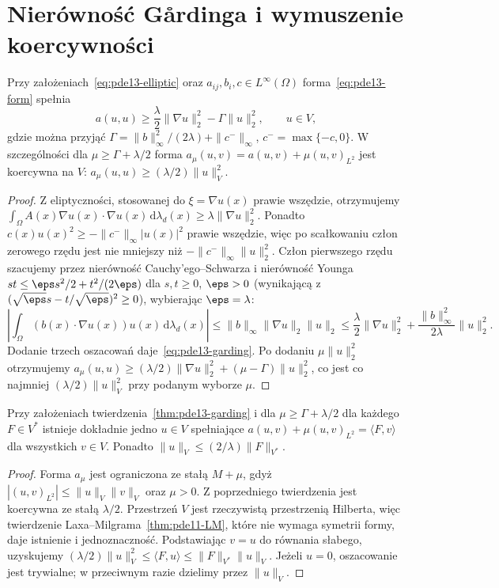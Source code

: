 \section{Nierówność Gårdinga i wymuszenie koercywności}
\label{sec:pde13-garding}
\begin{twierdzenie}
\label{thm:pde13-garding}
Przy założeniach~\eqref{eq:pde13-elliptic} oraz
$a_{ij},b_i,c\in L^\infty(\Omega)$ forma~\eqref{eq:pde13-form}
spełnia
\begin{equation}\label{eq:pde13-garding}
 a(u,u)\geq\frac\lambda2\|\nabla u\|_2^2
 -\Gamma\|u\|_2^2,\qquad u\in V,
\end{equation}
gdzie można przyjąć
$\Gamma=\|b\|_\infty^2/(2\lambda)+\|c^-\|_\infty$,
$c^-=\max\{-c,0\}$. W szczególności dla
$\mu\geq\Gamma+\lambda/2$ forma
$a_\mu(u,v)=a(u,v)+\mu(u,v)_{L^2}$ jest koercywna na $V$:
$a_\mu(u,u)\geq(\lambda/2)\|u\|_V^2$.
\end{twierdzenie}
\begin{proof}
Z eliptyczności, stosowanej do $\xi=\nabla u(x)$ prawie wszędzie,
otrzymujemy
$\int_\Omega A(x)\nabla u(x)\cdot\nabla u(x)\,\mathrm d\lambda_d(x)
\geq\lambda\|\nabla u\|_2^2$.
Ponadto $c(x)u(x)^2\geq-\|c^-\|_\infty |u(x)|^2$ prawie wszędzie,
więc po scałkowaniu człon zerowego rzędu jest nie mniejszy
niż $-\|c^-\|_\infty\|u\|_2^2$.
Człon pierwszego rzędu szacujemy przez nierówność Cauchy'ego--Schwarza
i nierówność Younga $st\leq\eps s^2/2+t^2/(2\eps)$
dla $s,t\geq0$, $\eps>0$ (wynikającą z
$(\sqrt{\eps}s-t/\sqrt{\eps})^2\geq0$), wybierając $\eps=\lambda$:
\[
 \left|\int_\Omega(b(x)\cdot\nabla u(x))u(x)\,\mathrm d\lambda_d(x)\right|
 \leq \|b\|_\infty\|\nabla u\|_2\|u\|_2
 \leq\frac\lambda2\|\nabla u\|_2^2+
 \frac{\|b\|_\infty^2}{2\lambda}\|u\|_2^2.
\]
Dodanie trzech oszacowań daje~\eqref{eq:pde13-garding}.
Po dodaniu $\mu\|u\|_2^2$ otrzymujemy
$a_\mu(u,u)\geq(\lambda/2)\|\nabla u\|_2^2+
(\mu-\Gamma)\|u\|_2^2$, co jest co najmniej
$(\lambda/2)\|u\|_V^2$ przy podanym wyborze $\mu$.
\end{proof}

\begin{twierdzenie}
\label{thm:pde13-shift}
Przy założeniach twierdzenia~\ref{thm:pde13-garding} i dla
$\mu\geq\Gamma+\lambda/2$ dla każdego $F\in V^*$ istnieje
dokładnie jedno $u\in V$ spełniające
$a(u,v)+\mu(u,v)_{L^2}=\langle F,v\rangle$ dla wszystkich $v\in V$.
Ponadto $\|u\|_V\leq(2/\lambda)\|F\|_{V^*}$.
\end{twierdzenie}
\begin{proof}
Forma $a_\mu$ jest ograniczona ze stałą $M+\mu$, gdyż
$|(u,v)_{L^2}|\le\|u\|_V\|v\|_V$ oraz $\mu>0$.
Z poprzedniego twierdzenia jest koercywna ze stałą $\lambda/2$.
Przestrzeń $V$ jest rzeczywistą przestrzenią Hilberta, więc
twierdzenie Laxa--Milgrama~\ref{thm:pde11-LM}, które nie wymaga
symetrii formy, daje istnienie i jednoznaczność. Podstawiając $v=u$ do równania słabego,
uzyskujemy $(\lambda/2)\|u\|_V^2\leq
\langle F,u\rangle\leq\|F\|_{V^*}\|u\|_V$.
Jeżeli $u=0$, oszacowanie jest trywialne; w przeciwnym razie
dzielimy przez $\|u\|_V$.
\end{proof}

